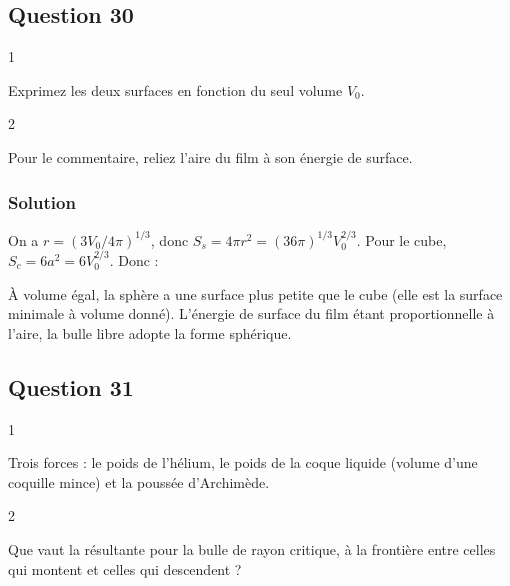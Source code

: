\documentclass[11pt,a4paper]{article}
\newcommand{\equationajustee}[1]{%
  \sbox{\boiteequation}{$\displaystyle #1$}%
  \ifdim\wd\boiteequation>\linewidth
    \[\resizebox{\linewidth}{!}{\usebox{\boiteequation}}\]%
  \else
    \[#1\]%
  \fi}
\begin{document}
\hypertarget{question-30}{%
\subsection{Question 30}\label{question-30}}

\begin{indication}{1}

Exprimez les deux surfaces en fonction du seul volume \(V_0\).

\end{indication}

\begin{indication}{2}

Pour le commentaire, reliez l'aire du film à son énergie de surface.

\end{indication}

\hypertarget{solution-29}{%
\subsubsection{Solution}\label{solution-29}}

On a \(r=(3V_0/4\pi)^{1/3}\), donc \(S_s=4\pi r^2=(36\pi)^{1/3}V_0^{2/3}\). Pour le cube, \(S_c=6a^2=6V_0^{2/3}\). Donc :

\equationajustee{\begin{aligned}
\frac{S_s}{S_c}&=\left(\frac{36\pi}{216}\right)^{1/3}\\
&=\boxed{\left(\frac\pi6\right)^{1/3}\approx0{,}81<1}
\end{aligned}}

À volume égal, la sphère a une surface plus petite que le cube (elle est la surface minimale à volume donné). L'énergie de surface du film étant proportionnelle à l'aire, la bulle libre adopte la forme sphérique.

\hypertarget{question-31}{%
\subsection{Question 31}\label{question-31}}

\begin{indication}{1}

Trois forces : le poids de l'hélium, le poids de la coque liquide (volume d'une coquille mince) et la poussée d'Archimède.

\end{indication}

\begin{indication}{2}

Que vaut la résultante pour la bulle de rayon critique, à la frontière entre celles qui montent et celles qui descendent ?

\end{indication}
\end{document}
